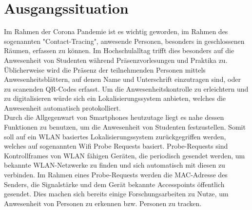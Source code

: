 \section{Ausgangssituation}
\label{introduction}

Im Rahmen der Corona Pandemie ist es wichtig geworden, im Rahmen des sogenannten "Contact-Tracing", anwesende Personen, besonders in geschlossenen Räumen, erfassen zu können.
Im Hochschulalltag trifft dies besonders auf die Anwesenheit von Studenten während Präsenzvorlesungen und Praktika zu.
Üblicherweise wird die Präsenz der teilnehmenden Personen mittels Anwesenheitsblättern, auf denen Name und Unterschrift einzutragen sind, oder zu scanenden QR-Codes erfasst.
Um die Anwesenheitskontrolle zu erleichtern und zu digitalisieren würde sich ein Lokalisierungssystem anbieten, welches die Anwesenheit automatisch protokolliert.
\\

Durch die Allgegenwart von Smartphones heutzutage liegt es nahe dessen Funktionen zu benutzen, um die Anwesenheit von Studenten festzustellen.
Somit soll auf ein WLAN basiertes Lokalisierungssystem zurückgegriffen werden, welches auf sogenannten Wifi Probe Requests basiert.
Probe-Requests sind Kontrollframes von WLAN fähigen Geräten, die periodisch gesendet werden, um bekannte WLAN-Netzwerke zu finden und sich automatisch mit diesen zu verbinden. \cite{wifiproberequests2019}
Im Rahmen eines Probe-Requests werden die MAC-Adresse des Senders, die Signalstärke und dem Gerät bekannte Accesspoints öffentlich gesendet.
Dies machen sich bereits einige Forschungsarbeiten zu Nutze, um Anwesenheit von Personen zu erkennen bzw. Personen zu tracken. \cite{sail2014,sherlock2018}
